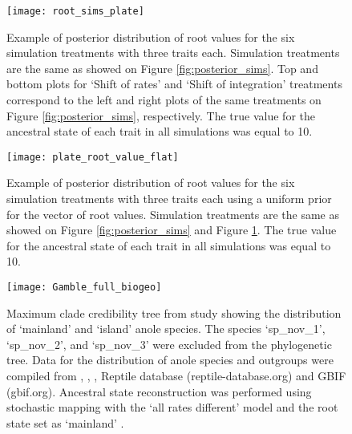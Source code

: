 \begin{figure}[h]
	\centering
	\texttt{[image: root\_sims\_plate]}
	\caption[Example of posterior distribution of root values for the six simulation treatments with three traits each.]{Example of posterior distribution of root values for the six simulation treatments with three traits each. Simulation treatments are the same as showed on Figure \ref{fig:posterior_sims}. Top and bottom plots for `Shift of rates' and `Shift of integration' treatments correspond to the left and right plots of the same treatments on Figure \ref{fig:posterior_sims}, respectively. The true value for the ancestral state of each trait in all simulations was equal to 10.}
	\label{fig:sup_root_sims}
\end{figure}

\begin{figure}[h]
	\centering
	\texttt{[image: plate\_root\_value\_flat]}
	\caption[Example of posterior distribution of root values for the six simulation treatments with three traits each using a uniform prior for the vector of root values.]{Example of posterior distribution of root values for the six simulation treatments with three traits each using a uniform prior for the vector of root values. Simulation treatments are the same as showed on Figure \ref{fig:posterior_sims} and Figure \ref{fig:sup_root_sims}. The true value for the ancestral state of each trait in all simulations was equal to 10.}
	\label{fig:sup_root_sims_flat}
\end{figure}

\begin{figure}[h]
	\centering
	\texttt{[image: Gamble\_full\_biogeo]}
	\caption[Maximum clade credibility tree from \citet{gamble_anolis_2014} study showing the distribution of `mainland' and `island' anole species.]{Maximum clade credibility tree from \citet{gamble_anolis_2014} study showing the distribution of `mainland' and `island' anole species. The species `sp\_nov\_1', `sp\_nov\_2', and `sp\_nov\_3'  were excluded from the phylogenetic tree. Data for the distribution of anole species and outgroups were compiled from \citet{nicholson_mainland_2005}, \citet{losos_lizards_2009}, \citet{thomas_body_2009}, Reptile database (reptile-database.org) and GBIF (gbif.org). Ancestral state reconstruction was performed using stochastic mapping with the `all rates different' model and the root state set as `mainland' \citep{nicholson_mainland_2005, losos_lizards_2009}. }
	\label{fig:biogeo_gamble}
\end{figure}

